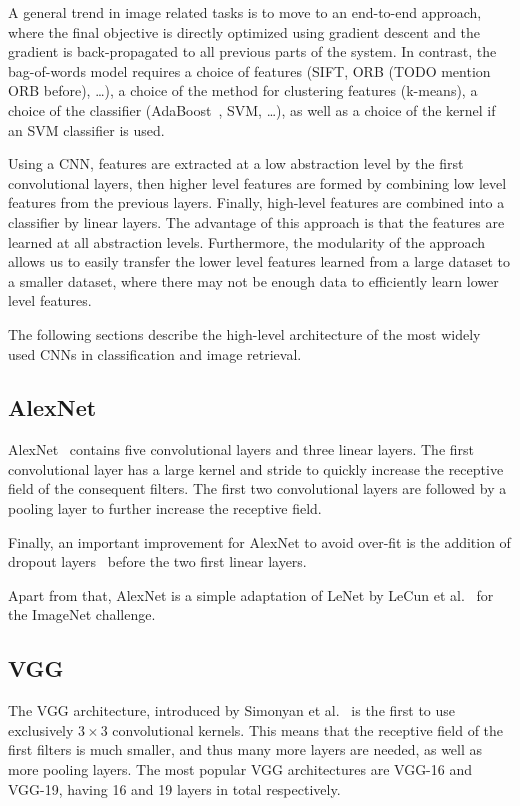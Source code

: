 A general trend in image related tasks is to move to an end-to-end
approach, where the final objective is directly optimized using gradient
descent and the gradient is back-propagated to all previous parts of the
system. In contrast, the bag-of-words model requires a choice of
features (SIFT, ORB (TODO mention ORB before), \dots),
a choice of the method for clustering features (k-means),
a choice of the classifier (AdaBoost~\cite{freund_desicion-theoretic_1995},
SVM, \dots), as well as a choice of the kernel if an SVM classifier is used.

Using a CNN, features are extracted at a low abstraction level by the
first convolutional layers, then higher level features are formed
by combining low level features from the previous layers. Finally,
high-level features are combined into a classifier by linear layers.
The advantage of this approach is that the features are learned at all
abstraction levels. Furthermore, the modularity of the approach allows
us to easily transfer the lower level features learned from a large dataset
to a smaller dataset, where there may not be enough data to efficiently
learn lower level features.

The following sections describe the high-level architecture of the
most widely used CNNs in classification and image retrieval.
\subsection{AlexNet}
AlexNet~\cite{krizhevsky_imagenet_2012} contains five convolutional
layers and three linear layers. The first convolutional layer
has a large kernel and stride to quickly increase the receptive field
of the consequent filters. The first two convolutional layers are followed
by a pooling layer to further increase the receptive field.

Finally, an important improvement for AlexNet to avoid over-fit is
the addition of dropout layers~\cite{hinton_improving_2012} before the
two first linear layers.

Apart from that, AlexNet is a simple adaptation of LeNet by
LeCun et al.~\cite{lecun_gradient-based_1998} for the ImageNet challenge.

\subsection{VGG}
The VGG architecture, introduced by Simonyan et al.~\cite{simonyan_very_2014}
is the first to use exclusively $3\times3$ convolutional kernels.
This means that the receptive field of the
first filters is much smaller, and thus many more layers are needed,
as well as more pooling layers. The most popular VGG architectures
are VGG-16 and VGG-19, having 16 and 19 layers in total respectively.

